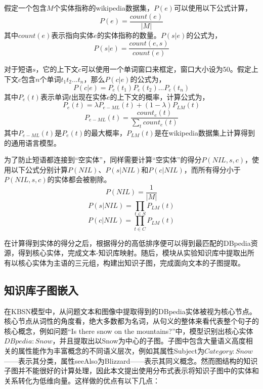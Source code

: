假定一个包含$M$个实体指称的wikipedia数据集，$P(e)$可以使用以下公式计算，
\begin{equation}
P(e) = \frac{count(e)}{|M|}
\end{equation}
其中$count(e)$表示指向实体$e$的实体指称的数量。$P(s|e)$的公式为，
\begin{equation}
P(s|e) = \frac{count(e,s)}{count(e)}
\end{equation}

对于短语$s$，它的上下文$c$可以使用一个单词窗口来框定，窗口大小设为50。假定上下文$c$包含$n$个单词$t_1t_2...t_n$，那么$P(c|e)$的公式为，
\begin{equation}
P(c|e) = P_e(t_1)P_e(t_2)...P_e(t_n)
\end{equation}
其中$P_e(t)$表示单词$t$出现在实体$e$的上下文的概率，计算公式为，
\begin{equation}
P_e(t) = \lambda P_{e-ML}(t) + (1-\lambda)P_{LM}(t)
\end{equation}
\begin{equation}
P_{e-ML}(t) = \frac{count_e(t)}{\sum_t count_e(t)}
\end{equation}
其中$P_{e-ML}(t)$是$P_e(t)$的最大概率，$P_{LM}(t)$是在wikipedia数据集上计算得到的通用语言模型。

为了防止短语都连接到“空实体”，同样需要计算“空实体”的得分$P(NIL,s,c)$，使用以下公式分别计算$P(NIL)$、$P(s|NIL)$和$P(c|NIL)$，而所有得分小于$P(NIL,s,c)$的实体都会被剔除。
\begin{equation}
P(NIL) = \frac{1}{|M|}
\end{equation}
\begin{equation}
P(s|NIL) = \prod_{t\in S}P_{LM}(t)
\end{equation}
\begin{equation}
P(c|NIL) = \prod_{t\in C}P_{LM}(t)
\end{equation}

在计算得到实体的得分之后，根据得分的高低排序便可以得到最匹配的DBpedia资源，得到核心实体，完成文本-知识库映射。随后，模块从实验知识库中提取出所有以核心实体为主语的三元组，构建出知识子图，完成面向文本的子图提取。


\subsection{知识库子图嵌入}
在KBSN模型中，从问题文本和图像中提取得到的DBpedia实体被视为核心节点。核心节点从词性的角度看，绝大多数都为名词，从句义的整体来看代表整个句子的核心概念，例如问题“Is there snow on the mountains?”中，模型识别出核心实体$DBpedia:Snow$，并且提取出以Snow为中心的子图。子图中包含大量语义高度相关的属性能作为丰富概念的不同语义层次，例如其属性Subject为$Category:Snow$——表示其分类，属性seeAlso为Blizzard——表示其同义概念。然而图结构的知识子图并不能很好的计算处理，因此本文提出使用分布式表示将知识子图中的实体和关系转化为低维向量。这样做的优点有以下几点：

